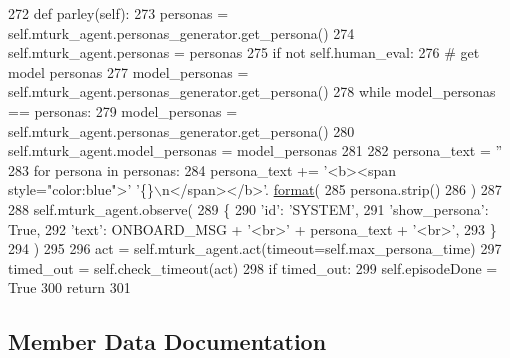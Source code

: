 \begin{DoxyCode}
272     \textcolor{keyword}{def }parley(self):
273         personas = self.mturk\_agent.personas\_generator.get\_persona()
274         self.mturk\_agent.personas = personas
275         \textcolor{keywordflow}{if} \textcolor{keywordflow}{not} self.human\_eval:
276             \textcolor{comment}{# get model personas}
277             model\_personas = self.mturk\_agent.personas\_generator.get\_persona()
278             \textcolor{keywordflow}{while} model\_personas == personas:
279                 model\_personas = self.mturk\_agent.personas\_generator.get\_persona()
280             self.mturk\_agent.model\_personas = model\_personas
281 
282         persona\_text = \textcolor{stringliteral}{''}
283         \textcolor{keywordflow}{for} persona \textcolor{keywordflow}{in} personas:
284             persona\_text += \textcolor{stringliteral}{'<b><span style="color:blue">'} \textcolor{stringliteral}{'\{\}\(\backslash\)n</span></b>'}.
      \hyperlink{namespaceparlai_1_1chat__service_1_1services_1_1messenger_1_1shared__utils_a32e2e2022b824fbaf80c747160b52a76}{format}(
285                 persona.strip()
286             )
287 
288         self.mturk\_agent.observe(
289             \{
290                 \textcolor{stringliteral}{'id'}: \textcolor{stringliteral}{'SYSTEM'},
291                 \textcolor{stringliteral}{'show\_persona'}: \textcolor{keyword}{True},
292                 \textcolor{stringliteral}{'text'}: ONBOARD\_MSG + \textcolor{stringliteral}{'<br>'} + persona\_text + \textcolor{stringliteral}{'<br>'},
293             \}
294         )
295 
296         act = self.mturk\_agent.act(timeout=self.max\_persona\_time)
297         timed\_out = self.check\_timeout(act)
298         \textcolor{keywordflow}{if} timed\_out:
299             self.episodeDone = \textcolor{keyword}{True}
300             \textcolor{keywordflow}{return}
301 
\end{DoxyCode}


\subsection{Member Data Documentation}
\mbox{\label{classprojects_1_1controllable__dialogue_1_1mturk_1_1worlds_1_1PersonaAssignWorld_a4820af5d7a4d448167b669d2b9a1a0ac}} 

